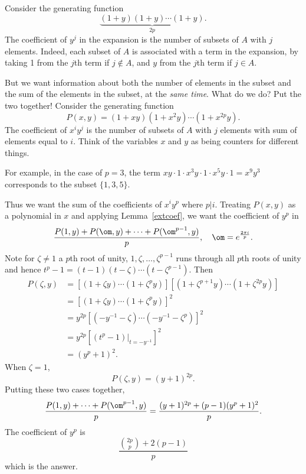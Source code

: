Consider the generating function
\[
\underbrace{(1+y)(1+y)\cdots (1+y)}_{2p}.
\]
The coefficient of $y^j$ in the expansion is the number of subsets of $A$ with $j$ elements. Indeed, each subset of $A$ is associated with a term in the expansion, by taking 1 from the $j$th term if $j\nin A$, and $y$ from the $j$th term if $j\in A$.

But we want information about both the number of elements in the subset and the sum of the elements in the subset, at the {\it same time}. What do we do? Put the two together! Consider the generating function
\[
P(x,y)=(1+xy)(1+x^2y)\cdots (1+x^{2p}y).
\]
The coefficient of $x^iy^j$ is the number of subsets of $A$ with $j$ elements with sum of elements equal to $i$. Think of the variables $x$ and $y$ as being counters for different things.

For example, in the case of $p=3$, the term $xy\cdot 1\cdot x^3y\cdot 1\cdot x^5y\cdot 1=x^9y^3$ corresponds to the subset $\{1,3,5\}$.

Thus we want the sum of the coefficients of $x^iy^p$ where $p|i$. Treating $P(x,y)$ as a polynomial in $x$ and applying Lemma~\ref{extcoef}, we want the coefficient of $y^p$ in
\begin{equation}\label{imo95-6-1}
\frac{P(1,y)+P(\om, y)+\cdots +P(\om^{p-1},y)}{p},\quad \om=e^{\frac{2\pi i}{p}}.
\end{equation}
Note for $\zeta\neq 1$ a $p$th root of unity, $1,\zeta,\ldots, \zeta^{p-1}$ runs through all $p$th roots of unity and hence $t^p-1=(t-1)(t-\zeta)\cdots (t-\zeta^{p-1})$. Then
\begin{align*}
P(\zeta,y)&=[(1+\zeta y)\cdots (1+\zeta^py)][(1+\zeta^{p+1}y)\cdots (1+\zeta^{2p}y)]\\
&=[(1+\zeta y)\cdots (1+\zeta^py)]^2\\
&=y^{2p}[(-y^{-1}-\zeta)\cdots (-y^{-1}-\zeta^p)]^2\\
&=y^{2p}[(t^p-1)|_{t=-y^{-1}}]^2\\
&=(y^p+1)^2.
\end{align*}
When $\zeta=1$,
\[P(\zeta,y)=(y+1)^{2p}.\]
Putting these two cases together,
\[
\frac{P(1,y)+\cdots +P(\om^{p-1},y)}{p}=\frac{(y+1)^{2p}+(p-1)(y^p+1)^2}{p}.
\]
The coefficient of $y^p$ is
\[
\frac{\binom{2p}{p}+2(p-1)}{p}
\]
which is the answer.

